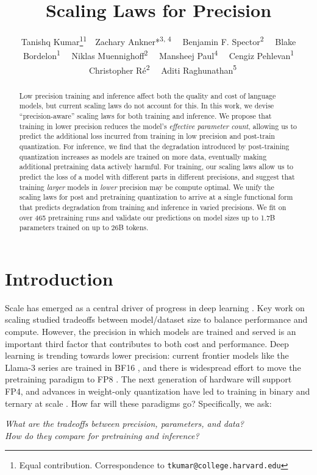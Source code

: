 \documentclass[11pt]{article}
\title{Scaling Laws for Precision}
\author[ ]{\small 
    Tanishq Kumar\thanks{Equal contribution. Correspondence to \texttt{tkumar@college.harvard.edu}}\textsuperscript{1}\ \ Zachary Ankner\footnotesize{*}\textsuperscript{3, 4} \ \ Benjamin F. Spector\textsuperscript{2} \ \  Blake Bordelon\textsuperscript{1} \ \ Niklas Muennighoff\textsuperscript{2} \ \ Mansheej Paul\textsuperscript{4} \ \ Cengiz Pehlevan\textsuperscript{1} \ \ Christopher Ré\textsuperscript{2} \ \ Aditi Raghunathan\textsuperscript{5}
}
\affil[1]{Harvard University}
\affil[2]{Stanford University}
\affil[3]{MIT}
\affil[4]{Databricks}
\affil[5]{Carnegie Mellon University}
\date{}
\begin{document}
\maketitle
\vspace{-1.25cm}

\begin{abstract}
Low precision training and inference affect both the quality and cost of language models, but current scaling laws do not account for this. In this work, we devise ``precision-aware'' scaling laws for both training and inference. We propose that training in lower precision reduces the model's \textit{effective parameter count}, allowing us to predict the additional loss incurred from training in low precision and post-train quantization. For inference, we find that the degradation introduced by post-training quantization increases as models are trained on more data, eventually making additional pretraining data actively harmful. For training, our scaling laws allow us to predict the loss of a model with different parts in different precisions, and suggest that training \textit{larger} models in \textit{lower} precision may be compute optimal.  We unify the scaling laws for post and pretraining quantization to arrive at a single functional form that predicts degradation from training and inference in varied precisions. We fit on over 465 pretraining runs and validate our predictions on model sizes up to 1.7B parameters trained on up to 26B tokens.
\end{abstract}

\vspace{-0.1cm}
\section{Introduction}


Scale has emerged as a central driver of progress in deep learning \citep{brown2020languagemodelsfewshotlearners}. Key work on scaling \citep{kaplan2020scaling, hoffmann2022training} studied tradeoffs between model/dataset size to balance performance and compute. However, the precision in which models are trained and served is an important third factor that contributes to both cost and performance. Deep learning is trending towards lower precision: current frontier models like the Llama-3 series are trained in BF16 \citep{dubey2024llama}, and there is widespread effort to move the pretraining paradigm to FP8 \citep{micikevicius2022fp8}. The next generation of hardware will support FP4, and advances in weight-only quantization have led to training in binary and ternary at scale \citep{ma2024era, wang2023bitnet}. How far will these paradigms go? Specifically, we ask: 
\begin{center}
\textit{What are the tradeoffs between precision, parameters, and data?\\How do they compare for pretraining and inference?}
\end{center}
\end{document}
